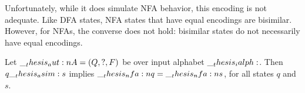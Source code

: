 Unfortunately, while it does simulate \ac{NFA} behavior, this encoding is not adequate.
Like \ac{DFA} states, \ac{NFA} states that have equal encodings are bisimilar.
However, for \acp{NFA}, the converse does not hold: bisimilar states do not necessarily have equal encodings.
%
\begin{falseclaim}
  Let $\__thesis_aut:n {A} = (Q, ?, F)$ be  over input alphabet $\__thesis_ialph:$.
  Then $q \__thesis_asim: s$ implies $\__thesis_nfa:n {q} = \__thesis_nfa:n {s}$, for all states $q$ and $s$.
\end{falseclaim}
%
